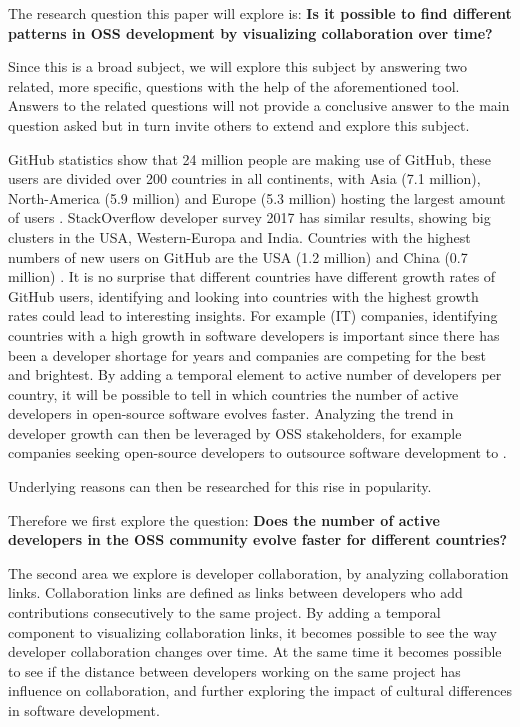 \documentclass[acmtog, authorversion]{acmart}
\begin{document}
The research question this paper will explore is: \textbf{Is it possible to find different patterns in OSS development by visualizing collaboration over time?}

Since this is a broad subject, we will explore this subject by answering two related, more specific, questions with the help of the aforementioned tool.
Answers to the related questions will not provide a conclusive answer to the main question asked but in turn invite others to extend and explore this subject.

GitHub statistics show that 24 million people are making use of GitHub, these users are divided over 200 countries in all continents, with Asia (7.1 million), North-America (5.9 million) and Europe (5.3 million) hosting the largest amount of users \cite{GHOctoverse}.
StackOverflow developer survey 2017 \cite{StackOverflow2017} has similar results, showing big clusters in the USA, Western-Europa and India.
Countries with the highest numbers of new users on GitHub are the USA (1.2 million) and China (0.7 million) \cite{GHOctoverse}.
It is no surprise that different countries have different growth rates of GitHub users, identifying and looking into countries with the highest growth rates could lead to interesting insights.
For example (IT) companies, identifying countries with a high growth in software developers is important since there has been a developer shortage for years and companies are competing for the best and brightest.
By adding a temporal element to active number of developers per country, it will be possible to tell in which countries the number of active developers in open-source software evolves faster.
Analyzing the trend in developer growth can then be leveraged by OSS stakeholders, for example companies seeking open-source developers to outsource software development to \cite{haefliger2008code}.

Underlying reasons can then be researched for this rise in popularity.

Therefore we first explore the question: \textbf{Does the number of active developers in the OSS community evolve faster for different countries?}

The second area we explore is developer collaboration, by analyzing collaboration links.
Collaboration links are defined as links between developers who add contributions consecutively to the same project.
By adding a temporal component to visualizing collaboration links, it becomes possible to see the way developer collaboration changes over time.
At the same time it becomes possible to see if the distance between developers working on the same project has influence on collaboration, and further exploring the impact of cultural differences in software development\cite{Mishra2014}.
\end{document}
